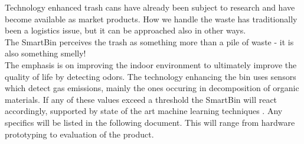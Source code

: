 Technology enhanced trash cans have already been subject to research and have become available as market products.
How we handle the waste has traditionally been a logistics issue, but it can be approached also in other ways. \\
The SmartBin perceives the trash as something more than a pile of waste - it is also something smelly!\\
The emphasis is on improving the indoor environment to ultimately improve the quality of life by detecting odors.
The technology enhancing the bin uses sensors which detect gas emissions, mainly the ones occuring in decomposition of organic materials.
If any of these values exceed a threshold the SmartBin will react accordingly, supported by state of the art machine learning techniques .
Any specifics will be listed in the following document. This will range from hardware prototyping to evaluation of the product.